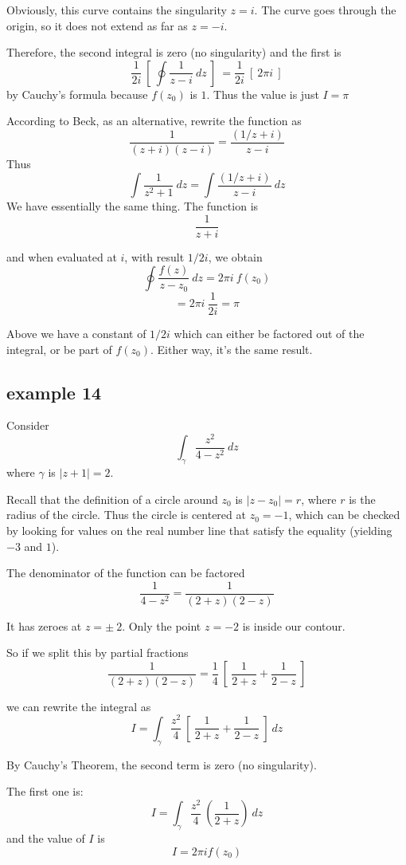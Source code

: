 \documentclass[11pt, oneside]{article}
\begin{document}
Obviously, this curve contains the singularity $z = i$.  The curve goes through the origin, so it does not extend as far as $z = -i$.

Therefore, the second integral is zero (no singularity) and the first is
\[ \frac{1}{2i} \ [ \ \oint \frac{1}{z - i}  \ dz \ ] \ = \frac{1}{2i} \ [ \  2 \pi i \ ] \]
by Cauchy's formula because $f(z_0)$ is $1$.  Thus the value is just $I = \pi$

According to Beck, as an alternative, rewrite the function as
\[ \frac{1}{(z + i) (z-i)} = \frac{(1/z+i)}{z-i} \]
Thus
\[ \int \frac{1}{z^2 + 1} \ dz = \int \frac{(1/z+i)}{z-i} \ dz \]
We have essentially the same thing.  The function is
\[ \frac{1}{z+i} \]

and when evaluated at $i$, with result $1/2i$, we obtain
\[ \oint  \frac{f(z)}{z-z_0} \ dz = 2 \pi i \ f(z_0) \]
\[ = 2 \pi i \ \frac{1}{2i} = \pi \]

Above we have a constant of $1/2i$ which can either be factored out of the integral, or be part of $f(z_0)$.  Either way, it's the same result.

\subsection*{example 14}

\label{sec:ex14PF}

Consider
\[ \int_{\gamma} \frac{z^2}{4-z^2} \ dz \]
where $\gamma$ is $ | z + 1 | = 2$.

Recall that the definition of a circle around $z_0$ is $| z - z_0 | = r$, where $r$ is the radius of the circle.  Thus the circle is centered at $z_0 = -1$, which can be checked by looking for values on the real number line that satisfy the equality (yielding $-3$ and $1$).

The denominator of the function can be factored
\[ \frac{1}{4-z^2} = \frac{1}{(2+z)(2-z)} \]

It has zeroes at $z = \pm \ 2$.  Only the point $z = -2$ is inside our contour.

So if we split this by partial fractions
\[  \frac{1}{(2+z)(2-z)} = \frac{1}{4} \ [ \ \frac{1}{2+z} + \frac{1}{2-z} \ ] \]

we can rewrite the integral as
\[ I = \int_{\gamma} \frac{z^2}{4} \ [ \ \frac{1}{2+z} + \frac{1}{2-z} \ ] \ dz \]

By Cauchy's Theorem, the second term is zero (no singularity).

The first one is:
\[ I = \int_{\gamma} \frac{z^2}{4} \ ( \frac{1}{2+z} ) \ dz \]
and the value of $I$ is
\[ I = 2 \pi i f(z_0) \]
\end{document}

